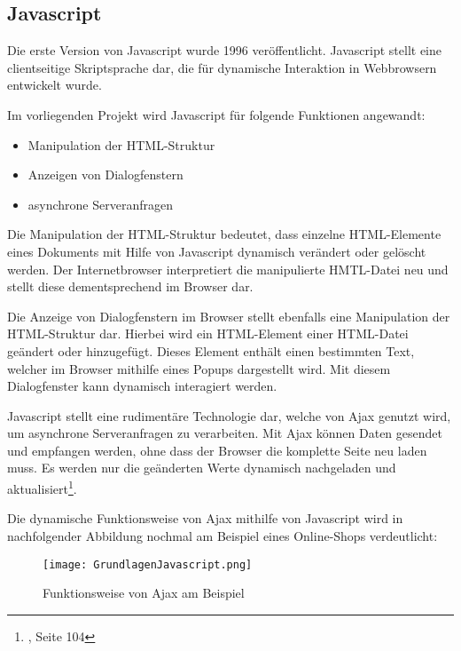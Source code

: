 \subsection{Javascript}
\label{sec:Javascript}

Die erste Version von Javascript wurde 1996 veröffentlicht. Javascript stellt eine clientseitige Skriptsprache dar, die für dynamische Interaktion in Webbrowsern entwickelt wurde.

Im vorliegenden Projekt wird Javascript für folgende Funktionen angewandt:

\begin{itemize}
  \item Manipulation der HTML-Struktur
  \item Anzeigen von Dialogfenstern
  \item asynchrone Serveranfragen
\end{itemize}

Die Manipulation der HTML-Struktur bedeutet, dass einzelne HTML-Elemente eines Dokuments mit Hilfe von Javascript dynamisch verändert oder gelöscht werden. Der Internetbrowser interpretiert die manipulierte HMTL-Datei neu und stellt diese dementsprechend im Browser dar.

Die Anzeige von Dialogfenstern im Browser stellt ebenfalls eine Manipulation der HTML-Struktur dar. Hierbei wird ein HTML-Element einer HTML-Datei geändert oder hinzugefügt. Dieses Element enthält einen bestimmten Text, welcher im Browser mithilfe eines Popups dargestellt wird. Mit diesem Dialogfenster kann dynamisch interagiert werden.

Javascript stellt eine rudimentäre Technologie dar, welche von Ajax genutzt wird, um asynchrone Serveranfragen zu verarbeiten. Mit Ajax können Daten gesendet und empfangen werden, ohne dass der Browser die komplette Seite neu laden muss.
Es werden nur die geänderten Werte dynamisch nachgeladen und aktualisiert\footnote{\citet{heinle2006}, Seite 104}.

Die dynamische Funktionsweise von Ajax mithilfe von Javascript wird in nachfolgender Abbildung nochmal am Beispiel eines Online-Shops verdeutlicht:

\begin{figure}[htb]
\centering
\texttt{[image: GrundlagenJavascript.png]}
\caption[Grundlagen Javascript]{Funktionsweise von Ajax am Beispiel\protect\footnotemark}
\label{fig:GrundlagendJavascript}
\end{figure}
